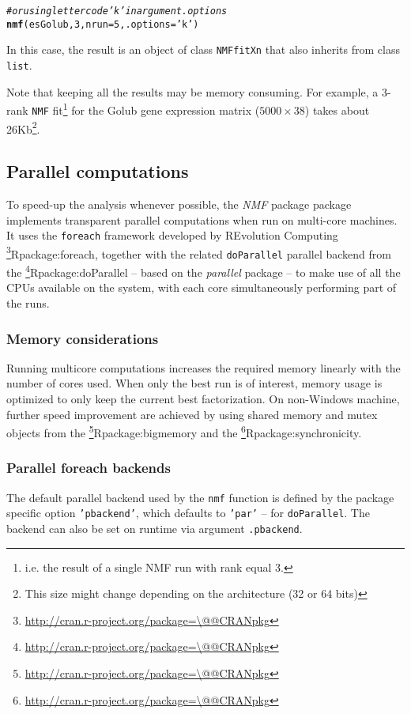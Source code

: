 \documentclass[a4paper]{article}\usepackage[]{graphicx}\usepackage[]{color}
\makeatletter
\newcommand{\hlnum}[1]{\textcolor[rgb]{0.686,0.059,0.569}{#1}}%
\newcommand{\hlstr}[1]{\textcolor[rgb]{0.192,0.494,0.8}{#1}}%
\newcommand{\hlcom}[1]{\textcolor[rgb]{0.678,0.584,0.686}{\textit{#1}}}%
\newcommand{\hlstd}[1]{\textcolor[rgb]{0.345,0.345,0.345}{#1}}%
\newcommand{\hlkwc}[1]{\textcolor[rgb]{0.333,0.667,0.333}{#1}}%
\newcommand{\hlkwd}[1]{\textcolor[rgb]{0.737,0.353,0.396}{\textbf{#1}}}%
\newenvironment{kframe}{%
 \def\at@end@of@kframe{}%
 \ifinner\ifhmode%
  \def\at@end@of@kframe{\end{minipage}}%
  \begin{minipage}{\columnwidth}%
 \fi\fi%
 \def\FrameCommand##1{\hskip\@totalleftmargin \hskip-\fboxsep
 \colorbox{shadecolor}{##1}\hskip-\fboxsep
     \hskip-\linewidth \hskip-\@totalleftmargin \hskip\columnwidth}%
 \MakeFramed {\advance\hsize-\width
   \@totalleftmargin\z@ \linewidth\hsize
   \@setminipage}}%
 {\par\unskip\endMakeFramed%
 \at@end@of@kframe}
\newenvironment{knitrout}{}{} %
\let\code=\texttt
\newcommand{\pkgname}[1]{\textit{#1}\xspace}
\newcommand{\Rpkg}[1]{\pkgname{#1} package\xspace}
\newcommand{\CRANurl}[1]{\url{http://cran.r-project.org/package=#1}}
\def\CRANpkg{\@ifstar\@CRANpkg\@@CRANpkg}
\def\@CRANpkg#1{\href{http://cran.r-project.org/package=#1}{\pkgname{#1}}\footnote{\CRANurl{#1}}}
\def\@@CRANpkg#1{\href{http://cran.r-project.org/package=#1}{\pkgname{#1}} package\footnote{\CRANurl{#1}}}
\def\citeCRANpkg{\@ifstar\@citeCRANpkg\@@citeCRANpkg}
\def\@citeCRANpkg#1{\CRANpkg{#1}\cite*{Rpackage:#1}}
\def\@@citeCRANpkg#1{\CRANpkg{#1}~\cite{Rpackage:#1}}
\newcommand{\nmfpack}{\Rpkg{NMF}}
\renewcommand{\cite}[1]{\parencite{#1}}
\makeatother
\begin{document}
\begin{knitrout}
\color{fgcolor}\begin{kframe}
\begin{alltt}
\hlcom{# or using letter code 'k' in argument .options}
\hlkwd{nmf}\hlstd{(esGolub,} \hlnum{3}\hlstd{,} \hlkwc{nrun}\hlstd{=}\hlnum{5}\hlstd{,} \hlkwc{.options}\hlstd{=}\hlstr{'k'}\hlstd{)}
\end{alltt}
\end{kframe}
\end{knitrout}

In this case, the result is an object of class \code{NMFfitXn} that also inherits from class \code{list}.

Note that keeping all the results may be memory consuming. 
For example, a 3-rank \code{NMF} fit\footnote{i.e. the result of a single NMF run with rank equal 3.} for the Golub gene expression matrix ($5000 \times 38$) takes about 26Kb\footnote{This size might change depending on the architecture (32 or 64 bits)}.

\subsection{Parallel computations}\label{multicore}

To speed-up the analysis whenever possible, the \nmfpack package implements transparent parallel computations when run on multi-core machines.
It uses the \code{foreach} framework developed by REvolution Computing
\citeCRANpkg{foreach}, together with the related \code{doParallel} parallel
backend from the \citeCRANpkg{doParallel} -- based on the
\pkgname{parallel} package -- to make use of all the CPUs available on the
system, with each core simultaneously performing part of the runs. 

\subsubsection{Memory considerations}
Running multicore computations increases the required memory linearly
with the number of cores used.
When only the best run is of interest, memory usage is
optimized to only keep the current best factorization.
On non-Windows machine, further speed improvement are achieved by using shared
memory and mutex objects from the \citeCRANpkg{bigmemory} and the 
\citeCRANpkg{synchronicity}.

\subsubsection{Parallel foreach backends}
The default parallel backend used by the \code{nmf} function is defined by the
package specific option \code{'pbackend'}, which defaults to \code{'par'} -- for
\code{doParallel}.
The backend can also be set on runtime via argument \code{.pbackend}.
\end{document}
